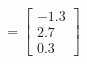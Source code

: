 \documentclass[preview]{standalone}
\begin{document}
\begin{align*}
=\begin{bmatrix} -1.3 \\ 2.7 \\ 0.3 \end{bmatrix}
\end{align*}
\end{document}
